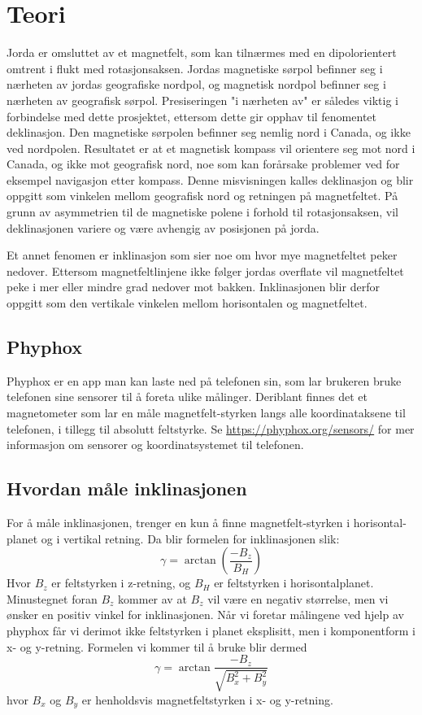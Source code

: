 \section{Teori}
Jorda er omsluttet av et magnetfelt, som kan tilnærmes med en 
dipolorientert omtrent i flukt med rotasjonsaksen. Jordas magnetiske sørpol 
befinner seg i nærheten av jordas geografiske nordpol, og magnetisk nordpol 
befinner seg i nærheten av geografisk sørpol. Presiseringen "i nærheten av" 
er således viktig i forbindelse med dette prosjektet, ettersom dette gir 
opphav til fenomentet deklinasjon. Den magnetiske sørpolen befinner seg 
nemlig nord i Canada, og ikke ved nordpolen. Resultatet er at et magnetisk 
kompass vil orientere seg mot nord i Canada, og ikke mot geografisk nord, 
noe som kan forårsake problemer ved for eksempel navigasjon etter kompass. 
Denne misvisningen kalles deklinasjon og blir oppgitt som vinkelen mellom 
geografisk nord og retningen på magnetfeltet. På grunn av asymmetrien til 
de magnetiske polene i forhold til rotasjonsaksen, vil deklinasjonen 
variere og være avhengig av posisjonen på jorda.

Et annet fenomen er inklinasjon som sier noe om hvor mye magnetfeltet peker 
nedover. Ettersom magnetfeltlinjene ikke følger jordas overflate vil 
magnetfeltet peke i mer eller mindre grad nedover mot bakken. Inklinasjonen 
blir derfor oppgitt som den vertikale vinkelen mellom horisontalen og
magnetfeltet.

\subsection{Phyphox}
Phyphox er en app man kan laste ned på telefonen sin, som lar brukeren 
bruke telefonen sine sensorer til å foreta ulike målinger. Deriblant finnes 
det et magnetometer som lar en måle magnetfelt-styrken langs alle 
koordinataksene til telefonen, i tillegg til absolutt feltstyrke. Se 
\hyperlink{https://phyphox.org/sensors/}{https://phyphox.org/sensors/}
for mer informasjon om sensorer og koordinatsystemet til telefonen.

\subsection{Hvordan måle inklinasjonen}
For å måle inklinasjonen, trenger en kun å finne magnetfelt-styrken i horisontal-
planet og i vertikal retning. Da blir formelen for inklinasjonen slik:
\begin{equation}
    \gamma = \arctan(\frac{-B_z}{B_H})
\end{equation}
Hvor $B_z$ er feltstyrken i z-retning, og $B_H$ er feltstyrken i horisontalplanet. 
Minustegnet foran $B_z$ kommer av at $B_z$ vil være en negativ størrelse, men vi 
ønsker en positiv vinkel for inklinasjonen. Når vi foretar målingene ved hjelp av 
phyphox får vi derimot ikke feltstyrken i planet eksplisitt, men i komponentform i 
x- og y-retning. Formelen vi kommer til å bruke blir dermed
\begin{equation}
    \gamma = \arctan{ \frac{-B_z}{\sqrt{B_x^2 + B_y^2}} }
\end{equation}
hvor $B_x$ og $B_y$ er henholdsvis magnetfeltstyrken i x- og y-retning.

